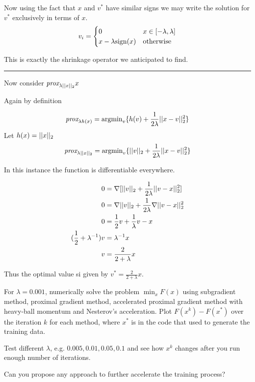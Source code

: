 \documentclass[11pt, answers]{exam}
\begin{document}
\begin{questions}
\begin{solution}
		Now using the fact that $x$ and $v^*$ have similar signs we may write the solution for $v^*$
		exclusively in terms of $x$.
		$$v_i = \begin{cases}0 & x\in [-\lambda, \lambda]\\
			x-\lambda\text{sign}(x) & \text{otherwise}
		\end{cases}$$

		This is exactly the shrinkage operator we anticipated to find.

		\vspace{.5in}\hrule\vspace{.5in}

		Now consider $\textit{prox}_{\lambda|| x ||_2}{x}$

		Again by definition

		$$\textit{prox}_{\lambda h(x)}=\text{argmin}_v\{h(v)+\frac{1}{2\lambda}|| x-v ||_2^2\}$$
		Let $h(x)=|| x ||_2$
		$$\textit{prox}_{\lambda || x ||_2}=\text{argmin}_v\{|| v ||_2+\frac{1}{2\lambda}|| x-v ||_2^2\}$$

		In this instance the function is differentiable everywhere.

		\begin{align*}
		0&= \nabla [|| v ||_2 +\frac{1}{2\lambda}|| v-x ||_2^2]\\
		0&= \nabla || v ||_2 +\frac{1}{2\lambda}\nabla || v-x ||_2^2\\
		0&= \frac{1}{2}v+\frac{1}{\lambda}v-x\\
		(\frac{1}{2}+\lambda^{-1})v &= \lambda^{-1} x\\
		v &= \frac{2}{2+\lambda}x
		\end{align*}

		Thus the optimal value si given by $v^* = \frac{2}{2+\lambda}x$.

	\end{solution}
	
	\question For $\lambda=0.001$, numerically solve the problem $\min_xF(x)$ using subgradient method,
	proximal gradient method, accelerated proximal gradient method with heavy-ball momentum and Nesterov's
	acceleration.
	Plot $F(x^k)-F(x^*)$ over the iteration $k$ for each method,
	where $x^*$ is in the code that used to generate the training data.

	\question Test different $\lambda$, e.g. $0.005,0.01,0.05,0.1$ and see how $x^k$ changes after you run enough number of iterations.

	\question Can you propose any approach to further accelerate the training process?


\end{questions}
\end{document}
